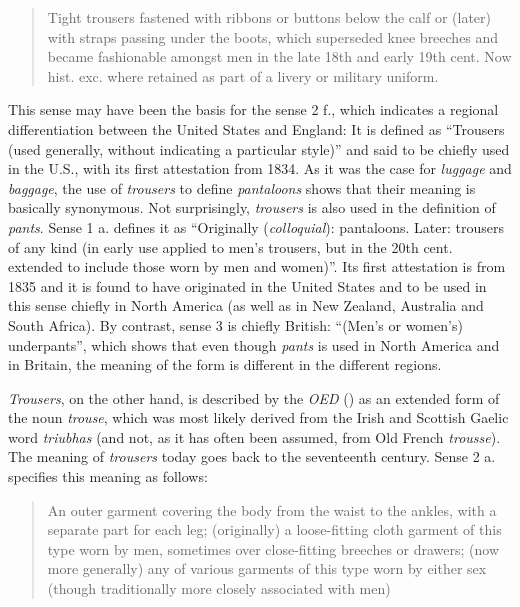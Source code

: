 \begin{quote}
Tight trousers fastened with ribbons or buttons below the calf or (later) with straps passing under the boots, which superseded knee breeches and became fashionable amongst men in the late 18th and early 19th cent. Now hist. exc. where retained as part of a livery or military uniform.
\end{quote}


This sense may have been the basis for the sense 2 f., which indicates a regional differentiation between the United States and England: It is defined as “Trousers (used generally, without indicating a particular style)” and said to be chiefly used in the U.S., with its first attestation from 1834. As it was the case for \emph{luggage} and \emph{baggage}, the use of \emph{trousers} to define \emph{pantaloons} shows that their meaning is basically synonymous. Not surprisingly, \emph{trousers} is also used in the definition of \emph{pants}. Sense 1 a. defines it as “Originally (\emph{colloquial}): pantaloons. Later: trousers of any kind (in early use applied to men’s trousers, but in the 20th cent. extended to include those worn by men and women)”. Its first attestation is from 1835 and it is found to have originated in the United States and to be used in this sense chiefly in North America (as well as in New Zealand, Australia and South Africa). By contrast, sense 3 is chiefly British: “(Men’s or women’s) underpants”, which shows that even though \emph{pants} is used in North America and in Britain, the meaning of the form is different in the different regions.


\emph{Trousers}, on the other hand, is described by the \emph{OED} (\citeyear{trousers}) as an extended form of the noun \emph{trouse}, which was most likely derived from the Irish and Scottish Gaelic word \emph{triubhas} (and not, as it has often been assumed, from Old French \emph{trousse}). The meaning of \emph{trousers} today goes back to the seventeenth century. Sense 2 a. specifies this meaning as follows:

\begin{quote}
An outer garment covering the body from the waist to the ankles, with a separate part for each leg; (originally) a loose-fitting cloth garment of this type worn by men, sometimes over close-fitting breeches or drawers; (now more generally) any of various garments of this type worn by either sex (though traditionally more closely associated with men)
\end{quote}


